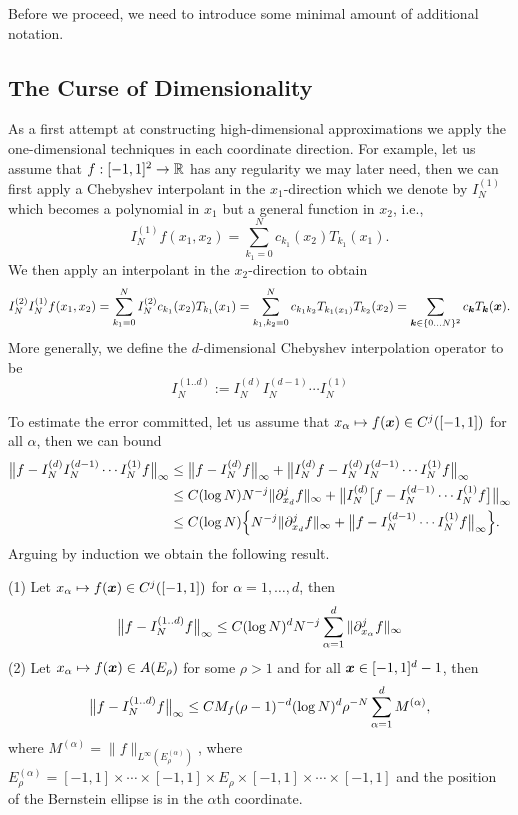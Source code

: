 Before we proceed, we need to introduce some minimal amount of additional
notation.


\subsection{The Curse of Dimensionality}
%
\label{sec:sparse:curse}
%
As a first attempt at constructing high-dimensional approximations we
apply the one-dimensional techniques in each coordinate direction. For
example, let us assume that $f : [-1,1]^2 \to \mathbb{R}$ has any regularity
we may later need, then we can first apply a Chebyshev interpolant
in the $x_1$-direction which we denote by $I_N^{(1)}$
which becomes a polynomial in $x_1$ but a general function in $x_2$, i.e.,
\[
    I^{(1)}_N f(x_1, x_2) =
    \sum_{k_1 = 0}^N c_{k_1}(x_2) T_{k_1}(x_1).
\]
We then apply an interpolant in the $x_2$-direction to obtain
\[
    I^{(2)}_N I^{(1)}_N f(x_1, x_2)
    = \sum_{k_1 = 0}^N I^{(2)}_N c_{k_1}(x_2) T_{k_1}(x_1)
    = \sum_{k_1, k_2 = 0}^N c_{k_1k_2} T_{k_1(x_1)} T_{k_2}(x_2)
    = \sum_{{\bm k} \in \{0\dots N\}^2} c_{\bm k} T_{\bm k}({\bm x}).
\]
More generally, we define the $d$-dimensional Chebyshev interpolation
operator to be
\[
    I^{(1..d)}_N :=  I^{(d)}_N I^{(d-1)}_N \cdots I^{(1)}_N
\]

To estimate the error committed, let us assume that $x_\alpha \mapsto f({\bm x}) \in
C^j([-1,1])$ for all $\alpha$, then we can bound
\begin{align*}
    \big\|f -  I^{(d)}_N I^{(d-1)}_N \cdots I^{(1)}_N f\big\|_\infty
    &\leq
    \big\|f -  I^{(d)}_N f\big\|_\infty
    + \big\| I^{(d)}_N f - I^{(d)}_N I^{(d-1)}_N \cdots I^{(1)}_N f \big\|_\infty  \\
    &\leq
    C (\log N) N^{-j} \| \partial_{x_d}^j f \|_\infty
    + \big\| I^{(d)}_N \big[ f - I^{(d-1)}_N \cdots I^{(1)}_N f\big] \big\|_\infty
    \\
    &\leq
    C (\log N) \Big\{ N^{-j} \| \partial_{x_d}^j f \|_\infty
    + \big\| f - I^{(d-1)}_N \cdots I^{(1)}_N f \big\|_\infty \Big\}.
\end{align*}
Arguing by induction we obtain the following result.

\begin{theorem} \label{th:sparse:curse}
    (1) Let $x_\alpha \mapsto f({\bm x}) \in C^j([-1,1])$ for $\alpha = 1, \dots,
    d$, then
    \[
        \big\|f -  I^{(1..d)}_N f\big\|_\infty
        \leq C (\log N)^d N^{-j} \sum_{\alpha = 1}^d \| \partial_{x_\alpha}^j f \|_\infty
    \]
    (2) Let $x_\alpha \mapsto f({\bm x}) \in A(E_\rho)$ for some $\rho > 1$ and for
    all ${\bm x} \in [-1,1]^d-1$, then
    \[
        \big\|f -  I^{(1..d)}_N f\big\|_\infty
        \leq
        C  M_f (\rho-1)^{-d} (\log N)^d \rho^{-N} \sum_{\alpha = 1}^d M^{(\alpha)},
    \]
    where $M^{(\alpha)} = \|f\|_{L^\infty(E_\rho^{(\alpha)})}$, where
    $E_\rho^{(\alpha)} = [-1,1] \times \cdots \times [-1,1] \times E_\rho
    \times [-1,1] \times \cdots \times [-1,1]$ and the position of the
    Bernstein ellipse is in the $\alpha$th coordinate.
\end{theorem}

